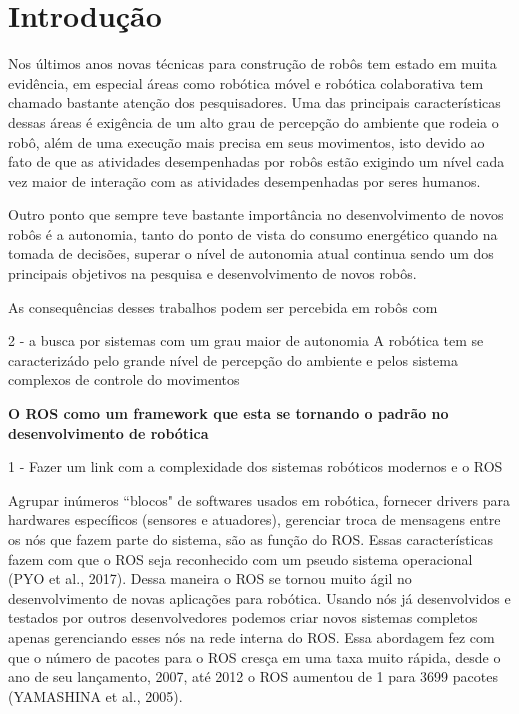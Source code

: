 \chapter{Introdução}


Nos últimos anos novas técnicas para construção de robôs tem estado em muita evidência, em 
especial áreas como robótica móvel e robótica colaborativa tem chamado bastante atenção dos 
pesquisadores. Uma das principais características dessas áreas é exigência de um alto grau de 
percepção do ambiente que rodeia o robô, além de uma execução mais precisa em seus movimentos, 
isto devido ao fato de que as atividades desempenhadas por robôs estão exigindo um nível cada 
vez maior de interação com as atividades desempenhadas por seres humanos.


Outro ponto que sempre teve bastante importância no desenvolvimento 
de novos robôs é a autonomia, tanto do ponto de vista do consumo energético quando na tomada 
de decisões, superar o nível de autonomia atual continua sendo um dos principais objetivos na 
pesquisa e desenvolvimento de novos robôs.

As consequências desses trabalhos podem ser percebida em robôs com 

2 - a busca por sistemas com um grau maior de autonomia
A robótica tem se caracterizádo pelo grande nível de percepção do ambiente e pelos sistema
complexos de controle do movimentos 


\textbf{O ROS como um framework que esta se tornando o padrão no desenvolvimento de robótica}

1 - Fazer um link com a complexidade dos sistemas robóticos modernos e o ROS

Agrupar inúmeros “blocos" de softwares usados em robótica, fornecer drivers para hardwares
específicos (sensores e atuadores), gerenciar troca de mensagens entre os nós que fazem 
parte do sistema, são as função do ROS. Essas características fazem com que o ROS seja 
reconhecido com um pseudo sistema operacional (PYO et al., 2017). Dessa maneira o ROS se 
tornou muito ágil no desenvolvimento de novas aplicações para robótica. Usando nós já 
desenvolvidos e testados por outros desenvolvedores podemos criar novos sistemas 
completos apenas gerenciando esses nós na rede interna do ROS. Essa abordagem fez com 
que o número de pacotes para o ROS cresça em uma taxa muito rápida, desde o ano de seu 
lançamento, 2007, até 2012 o ROS aumentou de 1 para 3699 pacotes (YAMASHINA et al., 2005).

